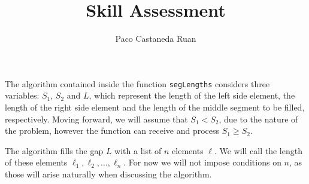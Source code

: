 \documentclass[12pt]{article}
\newcommand{\So}{S_1}
\newcommand{\St}{S_2}
\begin{document}
\title{Skill Assessment}

\author{Paco Castaneda Ruan}

\maketitle

The algorithm contained inside the function \verb|segLengths| considers three variables: $\So$, $\St$ and $L$, which represent the length of the left side element, the length of the right side element and the length of the middle segment to be filled, respectively. Moving forward, we will assume that $\So < \St$, due to the nature of the problem, however the function can receive and process $\So \geq \St$.

The algorithm fills the gap $L$ with a list of $n$ elements $\ell$. We will call the length of these elements $\ell_1, \ell_2, \dots, \ell_n$. For now we will not impose conditions on $n$, as those will arise naturally when discussing the algorithm. 
\end{document}
